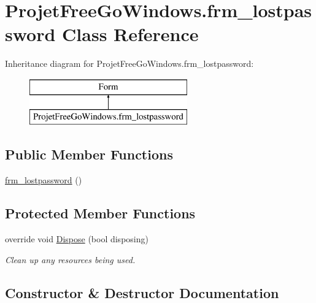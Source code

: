 \hypertarget{class_projet_free_go_windows_1_1frm__lostpassword}{}\section{Projet\+Free\+Go\+Windows.\+frm\+\_\+lostpassword Class Reference}
\label{class_projet_free_go_windows_1_1frm__lostpassword}
Inheritance diagram for Projet\+Free\+Go\+Windows.\+frm\+\_\+lostpassword\+:\begin{figure}[H]
\begin{center}
\leavevmode
\includegraphics[height=2.000000cm]{class_projet_free_go_windows_1_1frm__lostpassword}
\end{center}
\end{figure}
\subsection*{Public Member Functions}
\begin{DoxyCompactItemize}
\item 
\hyperlink{class_projet_free_go_windows_1_1frm__lostpassword_a16d2477680ecc6868ff5b89d207dff22}{frm\+\_\+lostpassword} ()
\end{DoxyCompactItemize}
\subsection*{Protected Member Functions}
\begin{DoxyCompactItemize}
\item 
override void \hyperlink{class_projet_free_go_windows_1_1frm__lostpassword_a7ec795479fd88d4c97680550b93703ff}{Dispose} (bool disposing)
\begin{DoxyCompactList}\small\item\em Clean up any resources being used. \end{DoxyCompactList}\end{DoxyCompactItemize}


\subsection{Constructor \& Destructor Documentation}
\mbox{\label{class_projet_free_go_windows_1_1frm__lostpassword_a16d2477680ecc6868ff5b89d207dff22}} 
